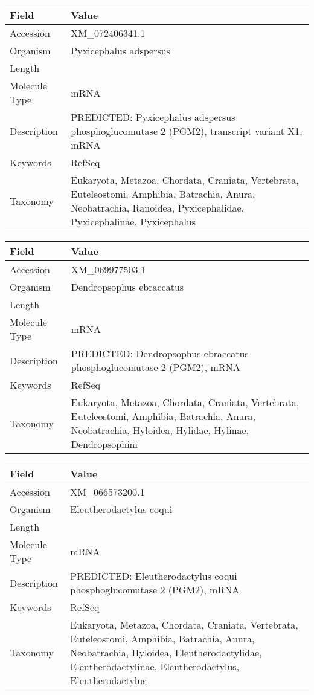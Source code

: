 \documentclass[10pt]{article}
\begin{document}
\vspace{1em}
{\footnotesize
\begin{longtable}{>{\raggedright\arraybackslash}p{4.5cm} >{\raggedright\arraybackslash}p{11.5cm}}
\textbf{Field} & \textbf{Value} \\
\hline
Accession & XM\_072406341.1 \\
Organism & Pyxicephalus adspersus \\
Length & 2457 \\
Molecule Type & mRNA \\
Description & PREDICTED: Pyxicephalus adspersus phosphoglucomutase 2 (PGM2), transcript variant X1, mRNA \\
Keywords & RefSeq \\
Taxonomy & Eukaryota, Metazoa, Chordata, Craniata, Vertebrata, Euteleostomi, Amphibia, Batrachia, Anura, Neobatrachia, Ranoidea, Pyxicephalidae, Pyxicephalinae, Pyxicephalus \\
\end{longtable}
}

\vspace{1em}
{\footnotesize
\begin{longtable}{>{\raggedright\arraybackslash}p{4.5cm} >{\raggedright\arraybackslash}p{11.5cm}}
\textbf{Field} & \textbf{Value} \\
\hline
Accession & XM\_069977503.1 \\
Organism & Dendropsophus ebraccatus \\
Length & 2621 \\
Molecule Type & mRNA \\
Description & PREDICTED: Dendropsophus ebraccatus phosphoglucomutase 2 (PGM2), mRNA \\
Keywords & RefSeq \\
Taxonomy & Eukaryota, Metazoa, Chordata, Craniata, Vertebrata, Euteleostomi, Amphibia, Batrachia, Anura, Neobatrachia, Hyloidea, Hylidae, Hylinae, Dendropsophini \\
\end{longtable}
}

\vspace{1em}
{\footnotesize
\begin{longtable}{>{\raggedright\arraybackslash}p{4.5cm} >{\raggedright\arraybackslash}p{11.5cm}}
\textbf{Field} & \textbf{Value} \\
\hline
Accession & XM\_066573200.1 \\
Organism & Eleutherodactylus coqui \\
Length & 2255 \\
Molecule Type & mRNA \\
Description & PREDICTED: Eleutherodactylus coqui phosphoglucomutase 2 (PGM2), mRNA \\
Keywords & RefSeq \\
Taxonomy & Eukaryota, Metazoa, Chordata, Craniata, Vertebrata, Euteleostomi, Amphibia, Batrachia, Anura, Neobatrachia, Hyloidea, Eleutherodactylidae, Eleutherodactylinae, Eleutherodactylus, Eleutherodactylus \\
\end{longtable}
}
\end{document}
